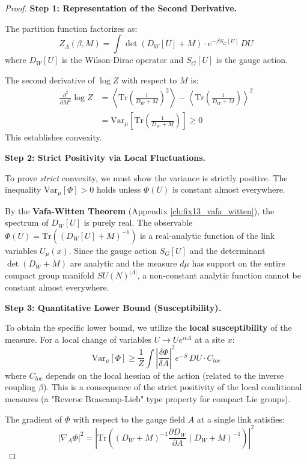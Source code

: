 \begin{proof}
\textbf{Step 1: Representation of the Second Derivative.}

The partition function factorizes as:
\[
Z_\Lambda(\beta, M) = \int \det(D_W[U] + M) \cdot e^{-\beta S_G[U]} \, DU
\]
where $D_W[U]$ is the Wilson-Dirac operator and $S_G[U]$ is the gauge action.

The second derivative of $\log Z$ with respect to $M$ is:
\begin{align}
\frac{\partial^2}{\partial M^2} \log Z &= \left\langle \mathrm{Tr}\left( \frac{1}{D_W + M} \right)^2 \right\rangle - \left\langle \mathrm{Tr}\left( \frac{1}{D_W + M} \right) \right\rangle^2 \\
&= \mathrm{Var}_\mu\left[ \mathrm{Tr}\left( \frac{1}{D_W + M} \right) \right] \geq 0
\end{align}
This establishes convexity.

\textbf{Step 2: Strict Positivity via Local Fluctuations.}

To prove \emph{strict} convexity, we must show the variance is strictly positive. The inequality $\mathrm{Var}_\mu[\Phi] > 0$ holds unless $\Phi(U)$ is constant almost everywhere.

By the \textbf{Vafa-Witten Theorem} (Appendix \ref{ch:fix13_vafa_witten}), the spectrum of $D_W[U]$ is purely real. The observable $\Phi(U) = \mathrm{Tr}\left( (D_W[U] + M)^{-1} \right)$ is a real-analytic function of the link variables $U_\mu(x)$.
Since the gauge action $S_G[U]$ and the determinant $\det(D_W+M)$ are analytic and the measure $d\mu$ has support on the entire compact group manifold $SU(N)^{|\Lambda|}$, a non-constant analytic function cannot be constant almost everywhere.

\textbf{Step 3: Quantitative Lower Bound (Susceptibility).}

To obtain the specific lower bound, we utilize the \textbf{local susceptibility} of the measure. For a local change of variables $U \to U e^{i \epsilon A}$ at a site $x$:
\[
\mathrm{Var}_\mu[\Phi] \geq \frac{1}{Z} \int \left| \frac{\delta \Phi}{\delta A} \right|^2 e^{-S} \, DU \cdot C_{loc}
\]
where $C_{loc}$ depends on the local hessian of the action (related to the inverse coupling $\beta$). This is a consequence of the strict positivity of the local conditional measures (a "Reverse Brascamp-Lieb" type property for compact Lie groups).

The gradient of $\Phi$ with respect to the gauge field $A$ at a single link satisfies:
\[
|\nabla_A \Phi|^2 = \left| \mathrm{Tr}\left( (D_W + M)^{-1} \frac{\partial D_W}{\partial A} (D_W + M)^{-1} \right) \right|^2
\]


\end{proof}
